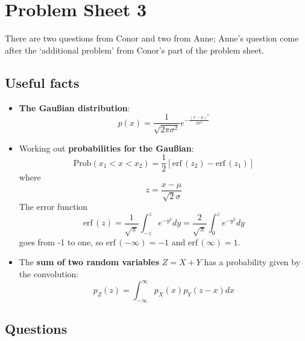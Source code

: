 \documentclass[11pt,a4paper]{scrartcl}
\begin{document}
\section*{Problem Sheet 3}

There are two questions from Conor and two from Anne; Anne's question come after the \lq{}additional problem\rq{} from Conor's part of the problem sheet.

\subsection*{Useful facts}

\begin{itemize}

\item \textbf{The Gau\ss{}ian distribution}:
$$
p(x)=\frac{1}{\sqrt{2\pi\sigma^2}}e^{-\frac{(x-\mu)^2}{2\sigma^2}}
$$

\item Working out \textbf{probabilities for the Gau\ss{}ian}:
$$
\mbox{Prob}(x_1<x<x_2)=\frac{1}{2}[\mbox{erf}\,(z_2)-\mbox{erf}\,(z_1)]
$$
where
$$
z=\frac{x-\mu}{\sqrt{2}\sigma}
$$
The error function 
$$\mbox{erf}\,(z)=\frac{1}{\sqrt{\pi}}\int_{-z}^ze^{-y^2}dy=\frac{2}{\sqrt{\pi}}\int_0^ze^{-y^2}dy$$ 
goes from -1 to one, so $\mbox{erf}\,(-\infty)=-1$ and $\mbox{erf}\,(\infty)=1$.

\item The \textbf{sum of two random variables} $Z=X+Y$ has a probability given by the convolution:
  $$
  p_Z(z)=\int_{-\infty}^\infty p_X(x)p_Y(z-x)dx
  $$

\end{itemize}


\subsection*{Questions}
\end{document}
